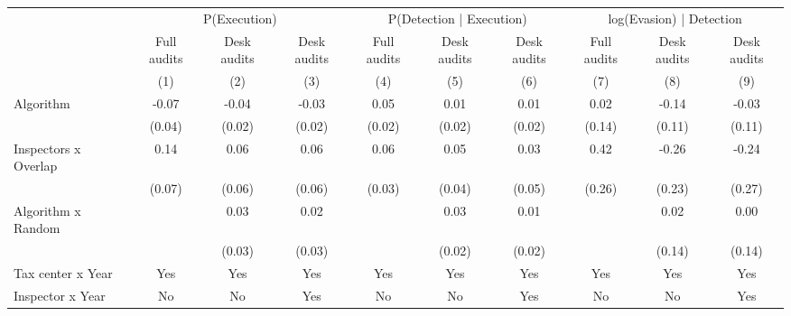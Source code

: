 \begin{tabular}{lccc|ccc|ccc} \toprule
\multicolumn{1}{l}{} & \multicolumn{3}{c}{P(Execution)} & \multicolumn{3}{c}{P(Detection | Execution)} & \multicolumn{3}{c}{log(Evasion) | Detection} \\\cmidrule(lr){2-4}\cmidrule(lr){5-7}\cmidrule(lr){8-10} \multicolumn{1}{l}{} & Full audits & Desk audits & Desk audits & Full audits & Desk audits & Desk audits & Full audits & Desk audits & Desk audits \\ \multicolumn{1}{l}{} & (1) & (2) & (3) & (4) & (5) & (6) & (7) & (8) & (9) \\ \midrule
Algorithm   &       -0.07\sym{*}  &       -0.04         &       -0.03         &        0.05\sym{**} &        0.01         &        0.01         &        0.02         &       -0.14         &       -0.03         \\
            &      (0.04)         &      (0.02)         &      (0.02)         &      (0.02)         &      (0.02)         &      (0.02)         &      (0.14)         &      (0.11)         &      (0.11)         \\
\addlinespace
Inspectors x Overlap&        0.14\sym{**} &        0.06         &        0.06         &        0.06\sym{*}  &        0.05         &        0.03         &        0.42         &       -0.26         &       -0.24         \\
            &      (0.07)         &      (0.06)         &      (0.06)         &      (0.03)         &      (0.04)         &      (0.05)         &      (0.26)         &      (0.23)         &      (0.27)         \\
\addlinespace
Algorithm x Random&                     &        0.03         &        0.02         &                     &        0.03         &        0.01         &                     &        0.02         &        0.00         \\
            &                     &      (0.03)         &      (0.03)         &                     &      (0.02)         &      (0.02)         &                     &      (0.14)         &      (0.14)         \\
\midrule
Tax center x Year&         Yes         &         Yes         &         Yes         &         Yes         &         Yes         &         Yes         &         Yes         &         Yes         &         Yes         \\
Inspector x Year&          No         &          No         &         Yes         &          No         &          No         &         Yes         &          No         &          No         &         Yes         \\

\end{tabular}

